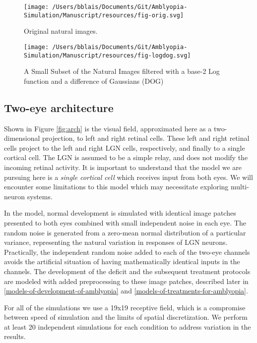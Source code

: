 \documentclass[
  onecolumn]{article}
\begin{document}
\begin{figure}
\hypertarget{fig:orig}{%
\centering
\texttt{[image: /Users/bblais/Documents/Git/Amblyopia-Simulation/Manuscript/resources/fig-orig.svg]}
\caption{Original natural images.}\label{fig:orig}
}
\end{figure}

\begin{figure}
\hypertarget{fig:logdog}{%
\centering
\texttt{[image: /Users/bblais/Documents/Git/Amblyopia-Simulation/Manuscript/resources/fig-logdog.svg]}
\caption{A Small Subset of the Natural Images filtered with a base-2 Log
function and a difference of Gaussians (DOG)}\label{fig:logdog}
}
\end{figure}

\hypertarget{two-eye-architecture}{%
\subsection{Two-eye architecture}\label{two-eye-architecture}}

Shown in Figure \ref{fig:arch} is the visual field, approximated here as
a two-dimensional projection, to left and right retinal cells. These
left and right retinal cells project to the left and right LGN cells,
respectively, and finally to a single cortical cell. The LGN is assumed
to be a simple relay, and does not modify the incoming retinal activity.
It is important to understand that the model we are pursuing here is a
\emph{single cortical cell} which receives input from both eyes. We will
encounter some limitations to this model which may necessitate exploring
multi-neuron systems.

In the model, normal development is simulated with identical image
patches presented to both eyes combined with small independent noise in
each eye. The random noise is generated from a zero-mean normal
distribution of a particular variance, representing the natural
variation in responses of LGN neurons. Practically, the independent
random noise added to each of the two-eye channels avoids the artificial
situation of having mathematically identical inputs in the channels. The
development of the deficit and the subsequent treatment protocols are
modeled with added preprocessing to these image patches, described later
in \ref{models-of-development-of-amblyopia} and
\ref{models-of-treatments-for-amblyopia}.

For all of the simulations we use a 19x19 receptive field, which is a
compromise between speed of simulation and the limits of spatial
discretization. We perform at least 20 independent simulations for each
condition to address variation in the results.
\end{document}
